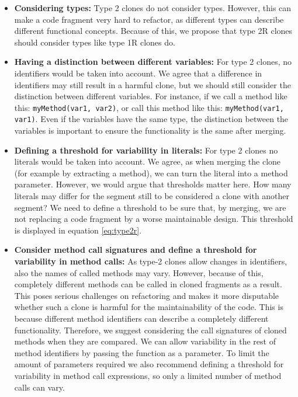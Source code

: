 \documentclass[a4paper]{article}
\begin{document}
\begin{itemize}
  \item \textbf{Considering types:} Type 2 clones do not consider types. However, this can make a code fragment very hard to refactor, as different types can describe different functional concepts. Because of this, we propose that type 2R clones should consider types like type 1R clones do.
  \item \textbf{Having a distinction between different variables:} For type 2 clones, no identifiers would be taken into account. We agree that a difference in identifiers may still result in a harmful clone, but we should still consider the distinction between different variables. For instance, if we call a method like this: \texttt{myMethod(var1, var2)}, or call this method like this: \texttt{myMethod(var1, var1)}. Even if the variables have the same type, the distinction between the variables is important to ensure the functionality is the same after merging.
  \item \textbf{Defining a threshold for variability in literals:} For type 2 clones no literals would be taken into account. We agree, as when merging the clone (for example by extracting a method), we can turn the literal into a method parameter. However, we would argue that thresholds matter here. How many literals may differ for the segment still to be considered a clone with another segment? We need to define a threshold to be sure that, by merging, we are not replacing a code fragment by a worse maintainable design. This threshold is displayed in equation \ref{eq:type2r}.
  \item \textbf{Consider method call signatures and define a threshold for variability in method calls:} As type-2 clones allow changes in identifiers, also the names of called methods may vary. However, because of this, completely different methods can be called in cloned fragments as a result. This poses serious challenges on refactoring and makes it more disputable whether such a clone is harmful for the maintainability of the code. This is because different method identifiers can describe a completely different functionality. Therefore, we suggest considering the call signatures of cloned methods when they are compared. We can allow variability in the rest of method identifiers by passing the function as a parameter. To limit the amount of parameters required we also recommend defining a threshold for variability in method call expressions, so only a limited number of method calls can vary.
\end{itemize}
\end{document}
